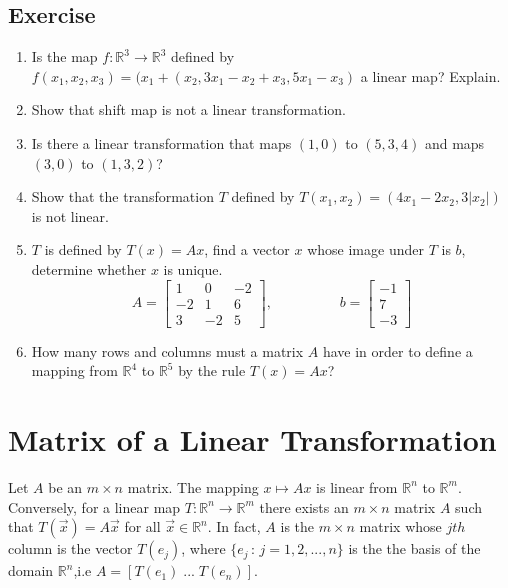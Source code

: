 \documentclass[aima104_lecturenotes_ku.tex]{subfiles}
\begin{document}
\subsection{Exercise}
\begin{enumerate}

\item Is the  map $f: \mathbb{R}^3 \to \mathbb{R}^3$ defined by $f(x_1,x_2,x_3)=(x_1+(x_2,3x_1-x_2+x_3,5x_1-x_3)$ a linear map? Explain.
\item Show that shift map is not a linear transformation.

\item Is there a linear transformation that maps $(1,0)$ to $(5,3,4)$ and maps $(3,0)$ to $(1,3,2)$?

\item Show that the transformation $T$ defined by $T(x_1,x_2)=(4x_1 - 2x_2, 3|x_2|)$ is not linear.
\item $T$ is defined by $T(x)=Ax$, find a vector $x$ whose image under $T$ is $b$, determine whether $x$ is unique.
  $$ A = \begin{bmatrix}
    1 & 0 & -2 \\
    -2 & 1 & 6 \\
    3 & -2 & 5
  \end{bmatrix}, \hspace{2cm}
  b= \begin{bmatrix}
    -1 \\ 7 \\ -3
  \end{bmatrix}
  $$

\item How many rows and columns must a matrix $A$ have in order to define a mapping from $\mathbb{R} ^4$ to $\mathbb{R} ^5$ by the rule $T(x) = Ax$?
\end{enumerate}

\section{Matrix of a Linear Transformation}
\begin{theorem}
  Let $A$ be an $m \times n$ matrix. The mapping $x \mapsto Ax$ is linear from $\mathbb{R}^n$ to $\mathbb{R}^m$.\\
  Conversely, for a linear map $T: \mathbb{R}^n \to \mathbb{R}^m$ there exists an $m \times n$ matrix $A$ such that $T(\vec{x})=A\vec{x}$ for all $\vec{x} \in \mathbb{R}^n$. In fact, $A$ is the $m \times n$ matrix whose $jth$ column is the vector $T(e_j)$, where $\{e_j\, : \, j=1,2,...,n\}$ is the the basis of the domain $\mathbb{R} ^n$,i.e $A= \left [ T(e_1)\; ... \; T(e_n)\right ]$.
\end{theorem}
\end{document}
